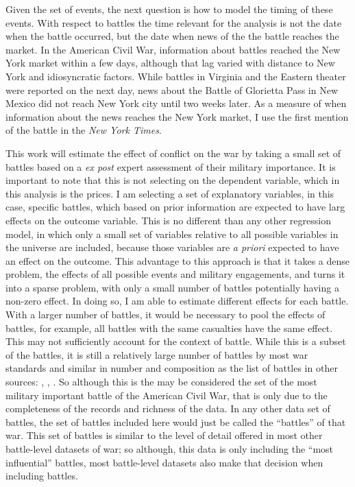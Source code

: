 Given the set of events, the next question is how to model the timing of these events.
With respect to battles the time relevant for the analysis is not the date when the battle occurred, but the date when news of the the battle reaches the market.
In the American Civil War, information about battles reached the New York market within a few days, although that lag varied with distance to New York and idiosyncratic factors.
While battles in Virginia and the Eastern theater were reported on the next day, news about the Battle of Glorietta Pass in New Mexico did not reach New York city until two weeks later.
As a measure of when information about the news reaches the New York market, I use the first mention of the battle in the \textit{New York Times}.


This work will estimate the effect of conflict on the war by taking a small set of battles based on a \textit{ex post} expert assessment of their military importance.
It is important to note that this is not selecting on the dependent variable, which in this analysis is the prices.
I am selecting a set of explanatory variables, in this case, specific battles, which based on prior information are expected to have larg effects on the outcome variable.
This is no different than any other regression model, in which only a small set of variables relative to all possible variables in the universe are included, because those variables are \textit{a priori} expected to have an effect on the outcome.
This advantage to this approach is that it takes a dense problem, the effects of all possible events and military engagements, and turns it into a sparse problem, with only a small number of battles potentially having a non-zero effect.
In doing so, I am able to estimate different effects for each battle.
With a larger number of battles, it would be necessary to pool the effects of battles, for example, all battles with the same casualties have the same effect.
This may not sufficiently account for the context of battle.
While this is a subset of the battles, it is still a relatively large number of battles by most war standards and similar in number and composition as the list of battles in other sources: \textcite{Livermore1900}, \textcite{Bodart1908}, \textcite{cdb90}.
So although this is the may be considered the set of the most military important battle of the American Civil War, that is only due to the completeness of the records and richness of the data.
In any other data set of battles, the set of battles included here would just be called the ``battles'' of that war.%
This set of battles is similar to the level of detail offered in most other battle-level datasets of war; so although, this data is only including the ``most influential'' battles, most battle-level datasets also make that decision when including battles.

